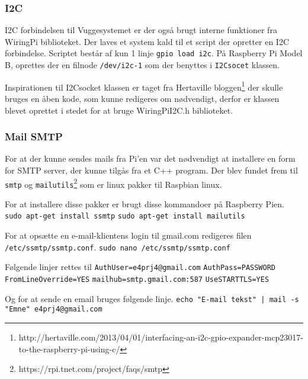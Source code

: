 \subsubsection*{I2C}

I2C forbindelsen til Vuggesystemet er der også brugt interne funktioner fra WiringPi biblioteket. Der laves et system kald til et script der opretter en I2C forbindelse. Scriptet består af kun 1 linje \verb+gpio load i2c+. På Raspberry Pi Model B, oprettes der en filnode \verb+/dev/i2c-1+ som der benyttes i \verb+I2Csocet+ klassen.

Inspirationen til I2Csocket klassen er taget fra Hertaville bloggen\footnote{http://hertaville.com/2013/04/01/interfacing-an-i2c-gpio-expander-mcp23017-to-the-raspberry-pi-using-c/} der skulle bruges en åben kode, som kunne redigeres om nødvendigt, derfor er klassen blevet oprettet i stedet for at bruge WiringPiI2C.h biblioteket.

\subsubsection*{Mail SMTP}

For at der kunne sendes mails fra Pi'en var det nødvendigt at installere en form for SMTP server, der kunne tilgås fra et C++ program. Der blev fundet frem til \verb+smtp+ og \verb+mailutils+\footnote{https://rpi.tnet.com/project/faqs/smtp} som er linux pakker til Raspbian linux.

For at installere disse pakker er brugt disse kommandoer på Raspberry Pien. \newline
\verb+sudo apt-get install ssmtp+ \newline
\verb+sudo apt-get install mailutils+

For at opsætte en e-mail-klientens login til gmail.com redigeres filen \verb+/etc/ssmtp/ssmtp.conf+. \newline
\verb+sudo nano /etc/ssmtp/ssmtp.conf+

Følgende linjer rettes til \newline
\verb+AuthUser=e4prj4@gmail.com+ \newline
\verb+AuthPass=PASSWORD+ \newline
\verb+FromLineOverride=YES+ \newline
\verb+mailhub=smtp.gmail.com:587+ \newline
\verb+UseSTARTTLS=YES+

Og for at sende en email bruges følgende linje. \newline
\verb+echo "E-mail tekst" | mail -s "Emne" e4prj4@gmail.com+






